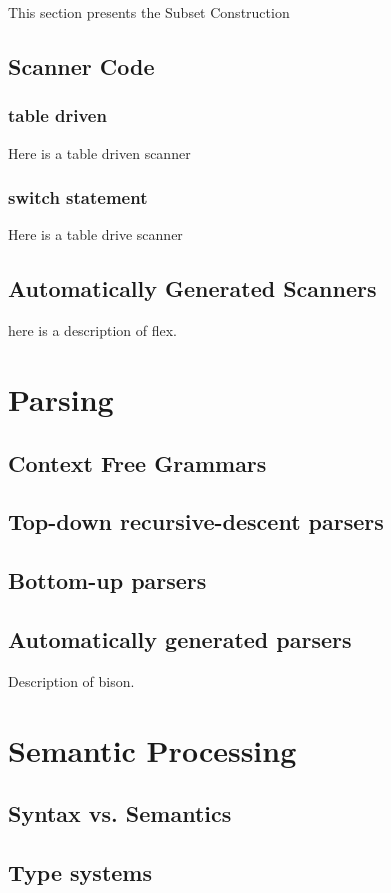 \documentclass[letterpaper,12pt,openany,reqno]{book}%
\begin{document}
This section presents the Subset Construction

\chapter{Scanner Code}
\section{table driven}
Here is a table driven scanner
\section{switch statement}
Here is a table drive scanner

\chapter{Automatically Generated Scanners}
here is a description of flex.

\part{Parsing} \label{part.parser}
\chapter{Context Free Grammars}
\chapter {Top-down recursive-descent parsers}
\chapter {Bottom-up parsers}
\chapter {Automatically generated parsers}
Description of bison.

\part {Semantic Processing}
\chapter {Syntax vs. Semantics}
\chapter {Type systems}
\end{document}
